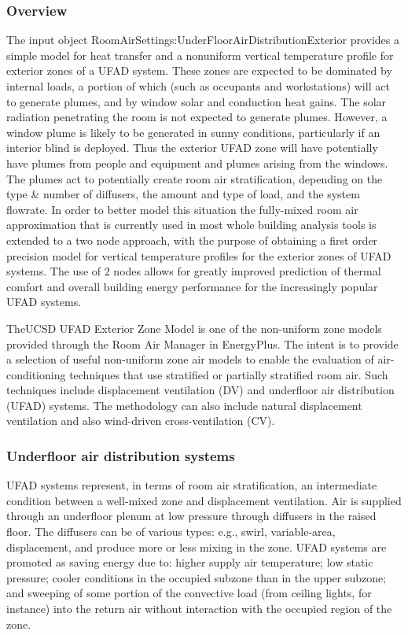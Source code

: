 \subsubsection{Overview}\label{overview-2-001}

The input object RoomAirSettings:UnderFloorAirDistributionExterior provides a simple model for heat transfer and a nonuniform vertical temperature profile for exterior zones of a UFAD system. These zones are expected to be dominated by internal loads, a portion of which (such as occupants and workstations) will act to generate plumes, and by window solar and conduction heat gains. The solar radiation penetrating the room is not expected to generate plumes. However, a window plume is likely to be generated in sunny conditions, particularly if an interior blind is deployed. Thus the exterior UFAD zone will have potentially have plumes from people and equipment and plumes arising from the windows. The plumes act to potentially create room air stratification, depending on the type \& number of diffusers, the amount and type of load, and the system flowrate. In order to better model this situation the fully-mixed room air approximation that is currently used in most whole building analysis tools is extended to a two node approach, with the purpose of obtaining a first order precision model for vertical temperature profiles for the exterior zones of UFAD systems. The use of 2 nodes allows for greatly improved prediction of thermal comfort and overall building energy performance for the increasingly popular UFAD systems.

TheUCSD UFAD Exterior Zone Model is one of the non-uniform zone models provided through the Room Air Manager in EnergyPlus. The intent is to provide a selection of useful non-uniform zone air models to enable the evaluation of air-conditioning techniques that use stratified or partially stratified room air. Such techniques include displacement ventilation (DV) and underfloor air distribution (UFAD) systems. The methodology can also include natural displacement ventilation and also wind-driven cross-ventilation (CV).

\subsubsection{Underfloor air distribution systems}\label{underfloor-air-distribution-systems-1}

UFAD systems represent, in terms of room air stratification, an intermediate condition between a well-mixed zone and displacement ventilation. Air is supplied through an underfloor plenum at low pressure through diffusers in the raised floor. The diffusers can be of various types: e.g., swirl, variable-area, displacement, and produce more or less mixing in the zone. UFAD systems are promoted as saving energy due to: higher supply air temperature; low static pressure; cooler conditions in the occupied subzone than in the upper subzone; and sweeping of some portion of the convective load (from ceiling lights, for instance) into the return air without interaction with the occupied region of the zone.

